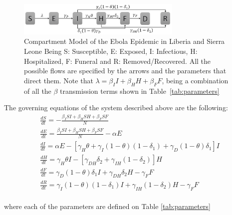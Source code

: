 \documentclass[10pt]{article}
\begin{document}
\begin{figure}
  \centering
  \includegraphics[width=0.7\textwidth]{compartment}
  \caption{Compartment Model of the Ebola Epidemic in Liberia and Sierra Leone \newline  Being S: Susceptible, E: Exposed, I: Infectious, H: Hospitalized, F: Funeral and R: Removed/Recovered. All the possible flows are specified by the arrows and the parameters that direct them. Note that $\lambda = \beta_{I}I+\beta_{H}H+\beta_{F}F $, being a combination of all the $\beta$ transmission terms shown in Table~\ref{tab:parameters}} 
\label{fig:compartment} 
\end{figure}

 

 The governing equations of the system described above are the following: \\

\begin{eqnarray} 
\frac{dS}{dt} = - \frac{\beta_{I}SI+\beta_{H}SH+\beta_{F}SF}{N}\\
\frac{dE}{dt} =  \frac{\beta_{I}SI+\beta_{H}SH+\beta_{F}SF}{N}-\alpha E\\
\frac{dI}{dt} =  \alpha E - [\gamma_{H}\theta + \gamma_{I}(1-\theta)(1-\delta_{1})+\gamma_{D}(1-\theta)\delta_{1}]I\\
\frac{dH}{dt} = \gamma_{H}\theta I - [\gamma_{DH}\delta_{2}+\gamma_{IH}(1-\delta_{2})]H\\
\frac{dF}{dt} = \gamma_{D}(1-\theta) \delta_{1} I + \gamma_{DH}\delta_{2} H-\gamma_{F} F\\
\frac{dR}{dt} = \gamma_{I}(1-\theta)(1- \delta_{1}) I + \gamma_{IH}(1-\delta_{2}) H-\gamma_{F} F
\end{eqnarray}\\

where each of the parameters are defined on Table \ref{tab:parameters} \\
\end{document}
